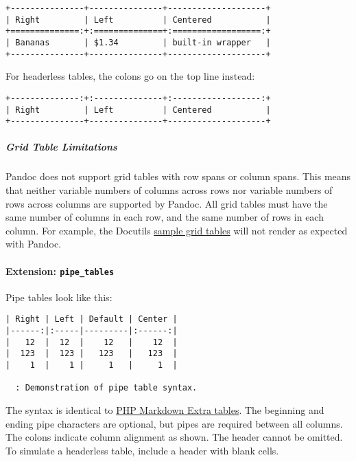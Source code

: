 \documentclass[]{article}
\begin{document}
\begin{verbatim}
+---------------+---------------+--------------------+
| Right         | Left          | Centered           |
+==============:+:==============+:==================:+
| Bananas       | $1.34         | built-in wrapper   |
+---------------+---------------+--------------------+
\end{verbatim}

For headerless tables, the colons go on the top line instead:

\begin{verbatim}
+--------------:+:--------------+:------------------:+
| Right         | Left          | Centered           |
+---------------+---------------+--------------------+
\end{verbatim}

\hypertarget{grid-table-limitations}{%
\subparagraph{Grid Table Limitations}\label{grid-table-limitations}}

Pandoc does not support grid tables with row spans or column spans. This
means that neither variable numbers of columns across rows nor variable
numbers of rows across columns are supported by Pandoc. All grid tables
must have the same number of columns in each row, and the same number of
rows in each column. For example, the Docutils
\href{https://docutils.sourceforge.io/docs/ref/rst/restructuredtext.html\#grid-tables}{sample
grid tables} will not render as expected with Pandoc.

\hypertarget{extension-pipe_tables}{%
\paragraph{\texorpdfstring{Extension:
\texttt{pipe\_tables}}{Extension: pipe\_tables}}\label{extension-pipe_tables}}

Pipe tables look like this:

\begin{verbatim}
| Right | Left | Default | Center |
|------:|:-----|---------|:------:|
|   12  |  12  |    12   |    12  |
|  123  |  123 |   123   |   123  |
|    1  |    1 |     1   |     1  |

  : Demonstration of pipe table syntax.
\end{verbatim}

The syntax is identical to
\href{https://michelf.ca/projects/php-markdown/extra/\#table}{PHP
Markdown Extra tables}. The beginning and ending pipe characters are
optional, but pipes are required between all columns. The colons
indicate column alignment as shown. The header cannot be omitted. To
simulate a headerless table, include a header with blank cells.
\end{document}
